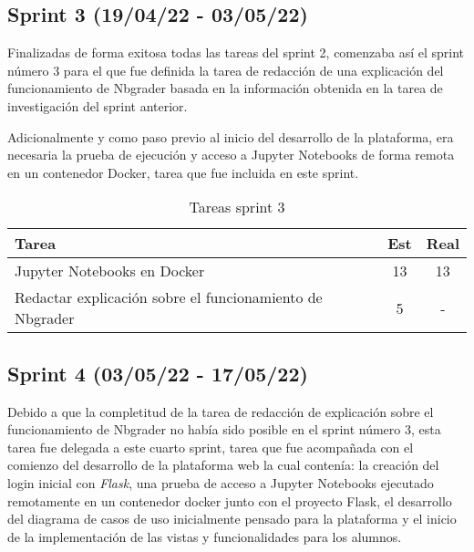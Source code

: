 \subsection{Sprint 3 (19/04/22 - 03/05/22)}
Finalizadas de forma exitosa todas las tareas del sprint 2, comenzaba así el sprint número 3 para el que fue definida la tarea de redacción de una explicación del funcionamiento de Nbgrader basada en la información obtenida en la tarea de investigación del sprint anterior.

Adicionalmente y como paso previo al inicio del desarrollo de la plataforma, era necesaria la prueba de ejecución y acceso a Jupyter Notebooks de forma remota en un contenedor Docker\cite{tool:Docker}, tarea que fue incluida en este sprint.

\begin{table}[h]
\begin{center}
\begin{tabular}{| l | c | c |}
\textbf{Tarea}                   & \textbf{Est} & \textbf{Real} \\ \hline
Jupyter Notebooks en Docker & 13 & 13 \\
Redactar explicación sobre el funcionamiento de Nbgrader & 5 & - \\ \hline
\end{tabular}
\caption{Tareas sprint 3}
\label{tab:sprint}
\end{center}
\end{table}



\subsection{Sprint 4 (03/05/22 - 17/05/22)}
Debido a que la completitud de la tarea de redacción de explicación sobre el funcionamiento de Nbgrader no había sido posible en el sprint número 3, esta tarea fue delegada a este cuarto sprint, tarea que fue acompañada con el comienzo del desarrollo de la plataforma web la cual contenía: la creación del login\cite{tool:FlaskLogin} inicial con \textit{Flask}, una prueba de acceso a Jupyter Notebooks\cite{tool:JupyterNotebooks} ejecutado remotamente en un contenedor docker junto con el proyecto Flask, el desarrollo del diagrama de casos de uso inicialmente pensado para la plataforma y el inicio de la implementación de las vistas y funcionalidades para los alumnos.



